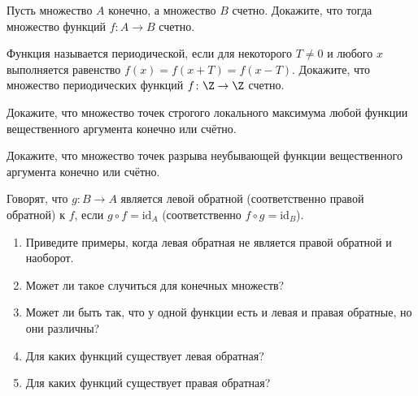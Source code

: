 \documentclass[a4paper,12pt,twoside]{article}
\begin{document}
\begin{?}
    Пусть множество $A$ конечно, а множество $B$ счетно. Докажите, что тогда множество функций $f\colon A \to B$ счетно.
\end{?}
\begin{?}
    Функция называется периодической, если для некоторого $T \neq 0$ и любого $x$ выполняется равенство $f(x) = f(x + T) = f(x - T)$. Докажите, что множество периодических функций $f \colon \Z \to \Z$  счетно.
\end{?}
\begin{?}
    Докажите, что множество точек строгого локального максимума любой функции вещественного аргумента конечно или счётно.
\end{?}
\begin{?}
    Докажите, что множество точек разрыва неубывающей функции вещественного аргумента конечно или счётно.
\end{?}
\begin{?}
    Говорят, что $g \colon B \to A$ является левой обратной (соответственно правой обратной) к $f$, если $g \circ f = \mathrm{id}_{A}$ (соответственно $f \circ g = \mathrm{id}_{B}$).
    \begin{enumerate}[noitemsep, topsep=0pt, parsep=0pt]
        \item Приведите примеры, когда левая обратная не является правой обратной и наоборот.
        \item Может ли такое случиться для конечных множеств?
        \item Может ли быть так, что у одной функции есть и левая и правая обратные, но они различны?
        \item Для каких функций существует левая обратная?
        \item Для каких функций существует правая обратная? 
    \end{enumerate}
\end{?}
\end{document}
